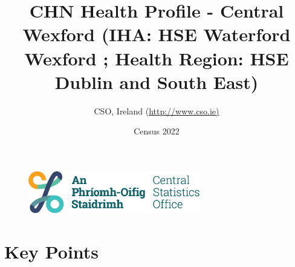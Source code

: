 \documentclass{article}
\title{CHN Health Profile - Central Wexford (IHA: HSE Waterford Wexford ;  Health Region: HSE Dublin and South East) }
\date{Census 2022}
\author{CSO, Ireland  (\url{http://www.cso.ie)}}
\begin{document}


\begin{figure}
	\centering
\includegraphics[width =75mm]{../figures/CSO_Logo.png}
\end{figure}

				 
		   
						  
														  
																																													
												 
			 
\maketitle
					
													   
				 
						 
																																																																											   
				 
				  
  \pagebreak
    	    \tableofcontents

\pagebreak


\section{Key Points}
\end{document}
